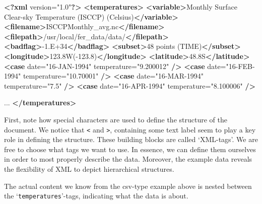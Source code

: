 \documentclass[
  12pt,
]{style/krantz}
\newenvironment{Shaded}{\begin{snugshade}}{\end{snugshade}}
\newcommand{\KeywordTok}[1]{\textcolor[rgb]{0.13,0.29,0.53}{\textbf{#1}}}
\newcommand{\NormalTok}[1]{#1}
\newcommand{\OtherTok}[1]{\textcolor[rgb]{0.56,0.35,0.01}{#1}}
\newcommand{\StringTok}[1]{\textcolor[rgb]{0.31,0.60,0.02}{#1}}
\begin{document}
\begin{Shaded}
\begin{Highlighting}[]
\KeywordTok{\textless{}?xml}\NormalTok{ version="1.0"}\KeywordTok{?\textgreater{}}
  \KeywordTok{\textless{}temperatures\textgreater{}}
    \KeywordTok{\textless{}variable\textgreater{}}\NormalTok{Monthly Surface Clear{-}sky Temperature (ISCCP) (Celsius)}\KeywordTok{\textless{}/variable\textgreater{}}
    \KeywordTok{\textless{}filename\textgreater{}}\NormalTok{ISCCPMonthly\_avg.nc}\KeywordTok{\textless{}/filename\textgreater{}}
    \KeywordTok{\textless{}filepath\textgreater{}}\NormalTok{/usr/local/fer\_data/data/}\KeywordTok{\textless{}/filepath\textgreater{}}
    \KeywordTok{\textless{}badflag\textgreater{}}\NormalTok{{-}1.E+34}\KeywordTok{\textless{}/badflag\textgreater{}}
    \KeywordTok{\textless{}subset\textgreater{}}\NormalTok{48 points (TIME)}\KeywordTok{\textless{}/subset\textgreater{}}
    \KeywordTok{\textless{}longitude\textgreater{}}\NormalTok{123.8W({-}123.8)}\KeywordTok{\textless{}/longitude\textgreater{}}
    \KeywordTok{\textless{}latitude\textgreater{}}\NormalTok{48.8S}\KeywordTok{\textless{}/latitude\textgreater{}}
    \KeywordTok{\textless{}case}\OtherTok{ date=}\StringTok{"16{-}JAN{-}1994"}\OtherTok{ temperature=}\StringTok{"9.200012"} \KeywordTok{/\textgreater{}}
    \KeywordTok{\textless{}case}\OtherTok{ date=}\StringTok{"16{-}FEB{-}1994"}\OtherTok{ temperature=}\StringTok{"10.70001"} \KeywordTok{/\textgreater{}}
    \KeywordTok{\textless{}case}\OtherTok{ date=}\StringTok{"16{-}MAR{-}1994"}\OtherTok{ temperature=}\StringTok{"7.5"} \KeywordTok{/\textgreater{}}
    \KeywordTok{\textless{}case}\OtherTok{ date=}\StringTok{"16{-}APR{-}1994"}\OtherTok{ temperature=}\StringTok{"8.100006"} \KeywordTok{/\textgreater{}}

\NormalTok{...}
  \KeywordTok{\textless{}/temperatures\textgreater{}}
\end{Highlighting}
\end{Shaded}

First, note how special characters are used to define the structure of the document. We notice that \texttt{\textless{}} and \texttt{\textgreater{}}, containing some text label seem to play a key role in defining the structure. These building blocks are called `XML-tags'. We are free to choose what tags we want to use. In essence, we can define them ourselves in order to most properly describe the data. Moreover, the example data reveals the flexibility of XML to depict hierarchical structures.

The actual content we know from the csv-type example above is nested between the `\texttt{temperatures}'-tags, indicating what the data is about.
\end{document}
